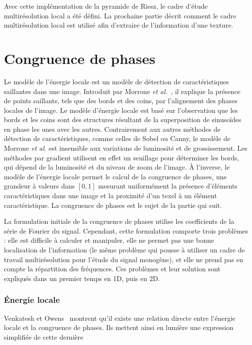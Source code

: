 Avec cette implémentation de la pyramide de Riesz, le cadre d'étude multirésolution local a été défini. La prochaine partie décrit comment le cadre multirésolution local est utilisé afin d'extraire de l'information d'une texture.

\section{Congruence de phases}

Le modèle de l'énergie locale est un modèle de détection de caractéristiques saillantes dans une image. Introduit par Morrone \textit{et al.}~\cite{morrone_mach_1986, morrone_feature_1987}, il explique la présence de points saillants, tels que des bords et des coins, par l'alignement des phases locales de l'image. Le modèle d'énergie locale est basé sur l'observation que les bords et les coins sont des structures résultant de la superposition de sinusoïdes en phase les unes avec les autres. Contrairement aux autres méthodes de détection de caractéristiques, comme celles de Sobel ou Canny, le modèle de Morrone \textit{et al.} est insensible aux variations de luminosité et de grossissement. Les méthodes par gradient utilisent en effet un seuillage pour déterminer les bords, qui dépend de la luminosité et du niveau de zoom de l'image. À l'inverse, le modèle de l'énergie locale permet le calcul de la congruence de phases, une grandeur à valeurs dans $[0, 1]$ mesurant uniformément la présence d'éléments caractéristiques dans une image et la proximité d'un texel à un élément caractéristique. La congruence de phases est le sujet de la partie qui suit.

\bigskip

La formulation initiale de la congruence de phases utilise les coefficients de la série de Fourier du signal. Cependant, cette formulation comporte trois problèmes : elle est difficile à calculer et manipuler, elle ne permet pas une bonne localisation de l'information (le même problème qui pousse à utiliser un cadre de travail multirésolution pour l'étude du signal monogène), et elle ne prend pas en compte la répartition des fréquences. Ces problèmes et leur solution sont expliqués dans un premier temps en 1D, puis en 2D.

\subsubsection{Énergie locale}

Venkatesh et Owens~\cite{venkatesh_energy_1989} montrent qu'il existe une relation directe entre l'énergie locale et la congruence de phases. Ils mettent ainsi en lumière une expression simplifiée de cette dernière

